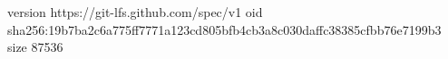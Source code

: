 version https://git-lfs.github.com/spec/v1
oid sha256:19b7ba2c6a775ff7771a123cd805bfb4cb3a8c030daffc38385cfbb76e7199b3
size 87536
